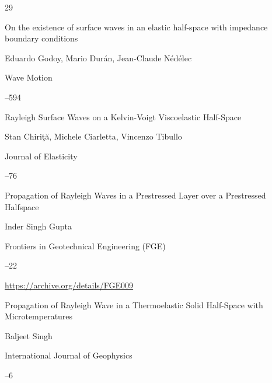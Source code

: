 \begin{thebibliography}{29}

\paper On the existence of surface waves in an elastic half-space with impedance boundary conditions

\by Eduardo Godoy, Mario Dur\'an, Jean-Claude N\'ed\'elec

\jour Wave Motion




–594





\paper Rayleigh Surface Waves on a Kelvin-Voigt Viscoelastic Half-Space

\by Stan Chiri{\c{t}}{\u{a}},  Michele Ciarletta, Vincenzo Tibullo 

\jour Journal of Elasticity




--76





\paper Propagation of Rayleigh Waves in a Prestressed Layer over a Prestressed Halfspace

\by Inder Singh Gupta 

\jour Frontiers in Geotechnical Engineering (FGE)




--22

\elink \url{https://archive.org/details/FGE009}




\paper Propagation of Rayleigh Wave in a Thermoelastic Solid Half-Space with Microtemperatures

\by Baljeet Singh

\jour International Journal of Geophysics



--6


\end{thebibliography}

